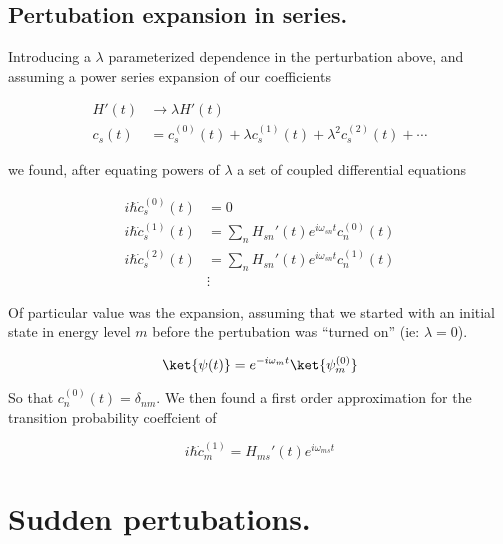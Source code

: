 \subsection{Pertubation expansion in series.}

Introducing a $\lambda$ parameterized dependence in the perturbation above, and assuming a power series expansion of our coefficients

\begin{equation}\label{eqn:qmTwoReview:n}
\boxed{
\begin{aligned}
H'(t) &\rightarrow \lambda H'(t) \\
c_s(t) &= c_s^{(0)}(t) + \lambda c_s^{(1)}(t) + \lambda^2 c_s^{(2)}(t) + \cdots
\end{aligned}
}
\end{equation}

we found, after equating powers of $\lambda$ a set of coupled differential equations

\begin{equation}\label{eqn:qmTwoReview:n}
\begin{aligned}
i \hbar \dot{c}_s^{(0)}(t) &= 0  \\
i \hbar \dot{c}_s^{(1)}(t) &= \sum_{n} H_{sn}'(t) e^{i \omega_{sn} t} c_n^{(0)}(t) \\
i \hbar \dot{c}_s^{(2)}(t) &= \sum_{n} H_{sn}'(t) e^{i \omega_{sn} t} c_n^{(1)}(t) \\
&\vdots
\end{aligned}
\end{equation}

Of particular value was the expansion, assuming that we started with an initial state in energy level $m$ before the pertubation was ``turned on'' (ie: $\lambda = 0$).

\begin{equation}\label{eqn:qmTwoReview:n}
\ket{\psi(t)} = e^{-i \omega_m t} \ket{\psi_m^{(0)} }
\end{equation}

So that $c_n^{(0)}(t) = \delta_{nm}$.  We then found a first order approximation for the transition probability coeffcient of

\begin{equation}\label{eqn:qmTwoReview:n}
\boxed{
i \hbar \dot{c}_m^{(1)} = H_{ms}'(t) e^{i \omega_{ms} t}
}
\end{equation}

\section{Sudden pertubations.}

